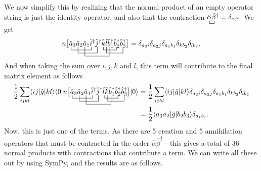 \documentclass[a4paper, 11pt, notitlepage, english]{article}
\newcommand{\op}[1]{\hat{#1}}
\newcommand{\braopket}[3]{\langle #1 | {#2} | #3 \rangle}
\begin{document}
We now simplify this by realizing that the normal product of an empty operator string is just the identity operator, and also that the contraction $\bcontraction{}{\alpha}{}{\beta}\op{\alpha}\op{\beta}^\dag = \delta_{\alpha\beta}.$ We get
$$n\big[
\bcontraction{}{a}{_1a_2 a_3}{i}
\bcontraction[2ex]{a_1}{a}{_2 a_3 i^\dag}{j}
\bcontraction[3ex]{a_1a_2}{a}{_3i^\dag j^\dag k l}{a}
\bcontraction[1ex]{a_1a_2a_3 i^\dag j^\dag}{k}{l a_1^\dag}{a}
\bcontraction[2ex]{a_1a_2a_3 i^\dag j^\dag k}{l}{a_1^\dag b_2^\dag}{a}
\op{a}_3 \op{a}_2 \op{a}_1 \op{i}^\dag \op{j}^\dag \op{k} \op{l} \op{b}_1^\dag\op{b}_2^\dag\op{b}_3^\dag\big] = 
%
\delta_{a_3 i}\delta_{a_2 j}\delta_{a_1 b_1} \delta_{k b_2} \delta_{l b_3}.$$
And when taking the sum over $i, j, k$ and $l$, this term will contribute to the final matrix element as follows
\begin{align*}
\frac{1}{2}\sum_{ijkl} \braopket{ij}{\op{g}}{kl} \braopket{0}{n\big[
\bcontraction{}{a}{_1a_2 a_3}{i}
\bcontraction[2ex]{a_1}{a}{_2 a_3 i^\dag}{j}
\bcontraction[3ex]{a_1a_2}{a}{_3i^\dag j^\dag k l}{a}
\bcontraction[1ex]{a_1a_2a_3 i^\dag j^\dag}{k}{l a_1^\dag}{a}
\bcontraction[2ex]{a_1a_2a_3 i^\dag j^\dag k}{l}{a_1^\dag b_2^\dag}{a}
\op{a}_3 \op{a}_2 \op{a}_1 \op{i}^\dag \op{j}^\dag \op{l} \op{k} \op{b}_1^\dag\op{b}_2^\dag\op{b}_3^\dag\big]}{0} &= \frac{1}{2}\sum_{ijkl} \braopket{ij}{\op{g}}{kl} \delta_{a_3 i}\delta_{a_2 j}\delta_{a_1 b_1} \delta_{k b_2} \delta_{l b_3} \\
&= \frac{1}{2} \braopket{a_3 a_2}{\op{g}}{b_2 b_3} \delta_{a_1 b_1}.
\end{align*}
Now, this is just one of the terms. As there are 5 creation and 5 annihilation operators that must be contracted in the order $\op{\alpha}\op{\beta}^\dag$---this gives a total of 36 normal products with contractions that contribute a term. We can write all these out by using SymPy, and the results are as follows. 
\end{document}
